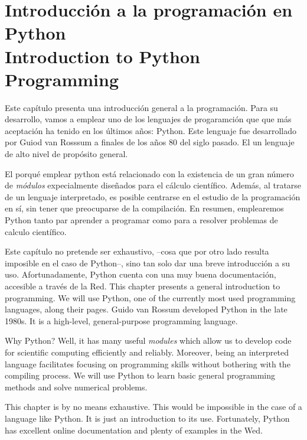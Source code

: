 \chapter[Intro a Python \textsection \textsection \ Intro to python]{Introducción a la programación en Python\\ Introduction to Python Programming}  
\begin{paracol}{2}
Este capítulo presenta una introducción general a la programación. Para su desarrollo, vamos a emplear uno de los lenguajes de progaramción que  que más aceptación ha tenido en los últimos años: Python. Este lenguaje fue desarrollado por Guiod van Rosssum a finales de los años 80 del siglo pasado. El un lenguaje de alto nivel de propósito general.

El porqué emplear python está relacionado con la existencia de un gran número de \emph{módulos} expecialmente diseñados para el cálculo científico. Además, al tratarse de un lenguaje interpretado, es posible centrarse en el estudio de la programación en sí, sin tener que preocuparse de la compilación. En resumen, emplearemos Python tanto par aprender a programar como para a resolver problemas de calculo científico.

Este capítulo no pretende ser exhaustivo, --cosa que por otro lado resulta imposible en el caso de Python--, sino tan solo dar una breve introducción a su uso. Afortunadamente, Python cuenta con una muy buena documentación, accesible a través de la Red. 
\switchcolumn 
This chapter presents a general introduction to programming. We will use Python, one of the currently most used programming languages, along their pages. Guido van Rossum developed Python in the late 1980s. It is a high-level, general-purpose programming language. 

Why Python? Well, it has many useful \emph{modules} which allow us to develop code for scientific computing efficiently and reliably. Moreover, being an interpreted language facilitates focusing on programming skills without bothering with the compiling process. We will use Python to learn basic general programming methods and solve numerical problems.

This chapter is by no means exhaustive. This would be impossible in the case of a language like Python. It is just an introduction to its use. Fortunately, Python has excellent online documentation and plenty of examples in the Wed. 
\end{paracol}


